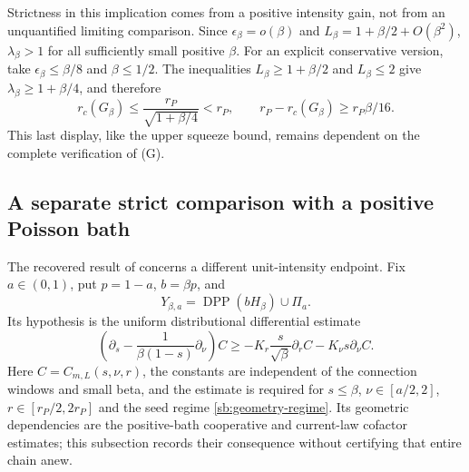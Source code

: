 \documentclass[11pt,a4paper]{article}
\theoremstyle{definition}
\theoremstyle{remark}
\numberwithin{equation}{section}
\begin{document}
Strictness in this implication comes from a positive intensity gain,
not from an unquantified limiting comparison. Since
$\epsilon_\beta=o(\beta)$ and $L_\beta=1+\beta/2+O(\beta^2)$,
$\lambda_\beta>1$ for all sufficiently small positive $\beta$.
For an explicit conservative version, take
$\epsilon_\beta\le\beta/8$ and $\beta\le1/2$. The inequalities
$L_\beta\ge1+\beta/2$ and $L_\beta\le2$ give
$\lambda_\beta\ge1+\beta/4$, and therefore
\[
 r_c(G_\beta)\le\frac{r_P}{\sqrt{1+\beta/4}}<r_P,
 \qquad r_P-r_c(G_\beta)\ge r_P\beta/16.
\]
This last display, like the upper squeeze bound, remains dependent on
the complete verification of (G).

\subsection{A separate strict comparison with a positive Poisson bath}
\label{sb:mixed-gap}

The recovered result of  concerns
a different unit-intensity endpoint. Fix $a\in(0,1)$, put $p=1-a$,
$b=\beta p$, and
\[
 Y_{\beta,a}=\operatorname{DPP}(bH_\beta)\cup\Pi_a.
\]
Its hypothesis is the uniform distributional differential estimate
\begin{equation}\label{sb:mixed-pde}
 \left(\partial_s-\frac1{\beta(1-s)}\partial_\nu\right)C
 \ge -K_r\frac{s}{\sqrt\beta}\partial_r C
       -K_\nu s\partial_\nu C.
\end{equation}
Here $C=C_{m,L}(s,\nu,r)$, the constants are independent of the
connection windows and small beta, and the estimate is required for
$s\le\beta$, $\nu\in[a/2,2]$, $r\in[r_P/2,2r_P]$ and the seed
regime \eqref{sb:geometry-regime}. Its geometric dependencies are the
positive-bath cooperative and current-law cofactor estimates; this
subsection records their consequence without certifying that entire
chain anew.
\end{document}
